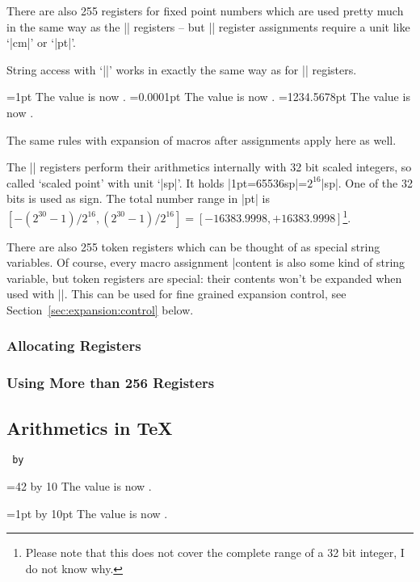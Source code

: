 \begin{command}{\dimen{}}
	There are also 255 registers for fixed point numbers which are used pretty much in the same way as the |\count| registers -- but |\dimen| register assignments require a unit like `|cm|' or `|pt|'.

	String access with `|\the|' works in exactly the same way as for |\count| registers.
\begin{codeexample}[]
=1pt
The value is now \the{}.
=0.0001pt
The value is now \the{}.
\def\macro{1234.5678}
=\macro pt
The value is now \the{}.
\end{codeexample}
	The same rules with expansion of macros after assignments apply here as well.

	The |\dimen| registers perform their arithmetics internally with 32 bit scaled integers, so called `scaled point' with unit `|sp|'. It holds |1pt=65536sp|=$2^{16}$|sp|. One of the 32 bits is used as sign. The total number range in |pt| is $[-(2^{30}-1)/2^{16}, (2^{30}-1)/2^{16} ] = [-16383.9998,+16383.9998]$\footnote{Please note that this does not cover the complete range of a 32 bit integer, I do not know why.}.
\end{command}

\begin{command}{\toks{}}
\label{cmd:toks}
	There are also 255 token registers which can be thought of as special string variables. Of course, every macro assignment |\def\macro|\marg{content} is also some kind of string variable, but token registers are special: their contents won't be expanded when used with |\the\toks|. This can be used for fine grained expansion control, see Section~\ref{sec:expansion:control} below.
\end{command}

\subsubsection{Allocating Registers}

\subsubsection{Using More than 256 Registers}

\subsection{Arithmetics in \TeX}
\begin{command}{\advance{}\texttt{ by}}
\begin{codeexample}[]
=42
\advance{} by 10
The value is now \the{}.
\end{codeexample}

\begin{codeexample}[]
=1pt
\advance{} by 10pt
The value is now \the{}.
\end{codeexample}
\end{command}

